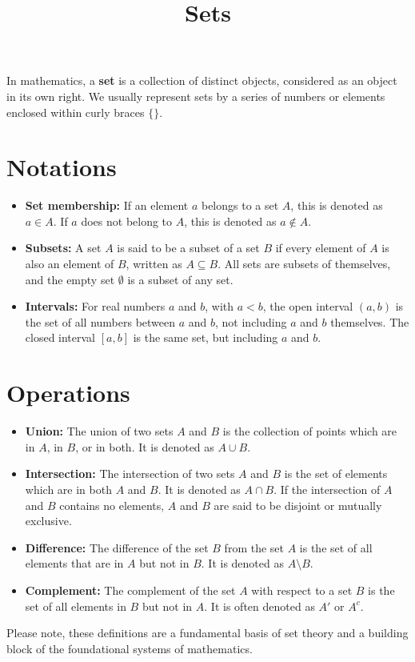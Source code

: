 \documentclass{article}
\begin{document}
\title{Sets}
\maketitle

In mathematics, a \textbf{set} is a collection of distinct objects, considered as an object in its own right. We usually represent sets by a series of numbers or elements enclosed within curly braces \(\{\}\).

\section*{Notations}

\begin{itemize}
  \item \textbf{Set membership:} If an element \(a\) belongs to a set \(A\), this is denoted as \(a \in A\). If \(a\) does not belong to \(A\), this is denoted as \(a \notin A\).

  \item \textbf{Subsets:} A set \(A\) is said to be a subset of a set \(B\) if every element of \(A\) is also an element of \(B\), written as \(A \subseteq B\). All sets are subsets of themselves, and the empty set \(\emptyset\) is a subset of any set.

  \item \textbf{Intervals:} For real numbers \(a\) and \(b\), with \(a < b\), the open interval \((a, b)\) is the set of all numbers between \(a\) and \(b\), not including \(a\) and \(b\) themselves. The closed interval \([a, b]\) is the same set, but including \(a\) and \(b\).
\end{itemize}

\section*{Operations}

\begin{itemize}
  \item \textbf{Union:} The union of two sets \(A\) and \(B\) is the collection of points which are in \(A\), in \(B\), or in both. It is denoted as \(A \cup B\).

  \item \textbf{Intersection:} The intersection of two sets \(A\) and \(B\) is the set of elements which are in both \(A\) and \(B\). It is denoted as \(A \cap B\). If the intersection of \(A\) and \(B\) contains no elements, \(A\) and \(B\) are said to be disjoint or mutually exclusive.

  \item \textbf{Difference:} The difference of the set \(B\) from the set \(A\) is the set of all elements that are in \(A\) but not in \(B\). It is denoted as \(A \setminus B\).
  
  \item \textbf{Complement:} The complement of the set \(A\) with respect to a set \(B\) is the set of all elements in \(B\) but not in \(A\). It is often denoted as \(A'\) or \(A^c\).
\end{itemize}

Please note, these definitions are a fundamental basis of set theory and a building block of the foundational systems of mathematics.
\end{document}
